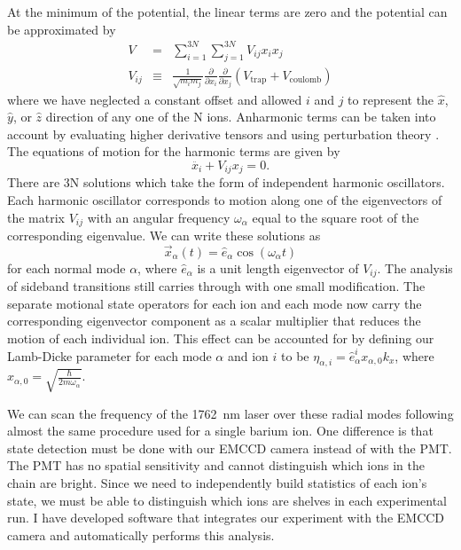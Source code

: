 At the minimum of the potential, the linear terms are zero and the potential can be approximated by
\begin{eqnarray}
	V &=& \sum\limits_{i=1}^{3N} \sum\limits_{j=1}^{3N} V_{ij} x_i x_j \\
	\label{eqn:mixedtrap}
	V_{ij} &\equiv& \frac{1}{\sqrt{m_i m_j}} \frac{ \partial }{ \partial x_i } \frac{ \partial }{ \partial x_j } ( V_\mathrm{trap} + V_\mathrm{coulomb} ) 
\end{eqnarray}
where we have neglected a constant offset and allowed $i$ and $j$ to represent the $\hat{x}$, $\hat{y}$, or $\hat{z}$ direction of any one of the N ions.  Anharmonic terms can be taken into account by evaluating higher derivative tensors and using perturbation theory \cite{Home:11}.  The equations of motion for the harmonic terms are given by
\begin{equation}
	\ddot{x_i} + V_{ij} x_j = 0 \mathrm{.}
\end{equation}
There are 3N solutions which take the form of independent harmonic oscillators.  Each harmonic oscillator corresponds to motion along one of the eigenvectors of the matrix $V_{ij}$ with an angular frequency $\omega_\alpha$ equal to the square root of the corresponding eigenvalue.  We can write these solutions as
\begin{equation}
	\vec{x}_{\alpha}(t) = \hat{e}_{\alpha} \cos(\omega_\alpha t)
\end{equation}
for each normal mode $\alpha$, where $\hat{e}_\alpha$ is a unit length eigenvector of $V_{ij}$.  The analysis of sideband transitions still carries through with one small modification.  The separate motional state operators for each ion and each mode now carry the corresponding eigenvector component as a scalar multiplier that reduces the motion of each individual ion.  This effect can be accounted for by defining our Lamb-Dicke parameter for each mode $\alpha$ and ion $i$ to be $\eta_{\alpha, i} = \hat{e}_{\alpha}^i x_{\alpha, 0} k_x$, where $x_{\alpha, 0} = \sqrt{ \frac{\hbar}{2 m \omega_\alpha} }$.

We can scan the frequency of the 1762~nm laser over these radial modes following almost the same procedure used for a single barium ion.  One difference is that state detection must be done with our EMCCD camera instead of with the PMT.  The PMT has no spatial sensitivity and cannot distinguish which ions in the chain are bright.  Since we need to independently build statistics of each ion's state, we must be able to distinguish which ions are shelves in each experimental run.  I have developed software that integrates our experiment with the EMCCD camera and automatically performs this analysis.


